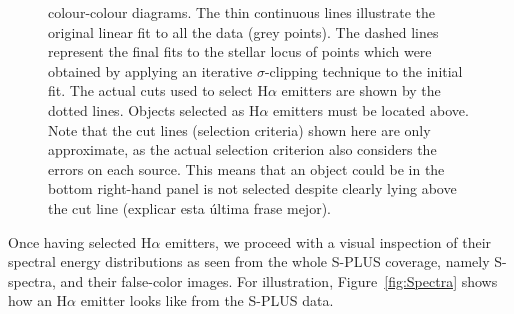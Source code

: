 \documentclass[fleqn,usenatbib]{mnras}
\begin{document}
\begin{figure}
{    colour-colour diagrams. The thin continuous lines illustrate the original linear
    fit to all the data (grey points). The dashed lines represent the final
    fits to the stellar locus of points which were obtained by applying an iterative
    $\sigma$-clipping technique to the initial fit. The actual cuts used to select
    H{$\alpha$} emitters are shown by the dotted lines. Objects selected as H{$\alpha$}
    emitters must be located above. Note that the cut lines (selection criteria) shown
    here are only approximate, as the actual selection criterion also considers the
    errors on each source. This means that an object could be in the bottom
    right-hand panel is not selected despite clearly lying above the cut line
    ({\sc explicar esta última frase mejor}).}
  \label{fig:criteria-color-plot}
\end{figure}

Once having selected H$\alpha$ emitters, we proceed with a visual inspection of 
their spectral energy distributions as seen from the whole S-PLUS coverage, namely 
S-spectra, and their false-color images. 
For illustration, Figure~\ref{fig:Spectra} shows how an H$\alpha$ emitter looks like from the S-PLUS data.
\end{document}
